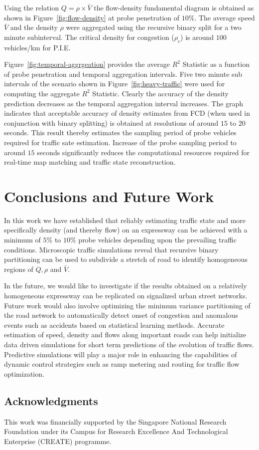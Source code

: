 \documentclass[procedia]{easychair}
\begin{document}
Using the relation $Q=\rho\times \bar{V}$ the flow-density fundamental diagram is obtained as shown in Figure~\ref{fig:flow-density} at probe penetration of $10\%$. The average speed $\bar{V}$ and the density $\rho$ were aggregated using the recursive binary split for a two minute subinterval. The critical density for congestion ($\rho_{c}$) is around $100$ vehicles/km for P.I.E.

Figure~\ref{fig:temporal-aggrgeation} provides the average $R^2$ Statistic as a function of probe penetration and temporal aggregation intervals. Five two minute sub intervals of the  scenario shown in Figure~\ref{fig:heavy-traffic} were used for computing the aggregate $R^2$ Statistic. Clearly the accuracy of the density prediction decreases as the temporal aggregation interval increases. The graph indicates that acceptable accuracy of density estimates from FCD (when used in conjunction with binary splitting) is obtained at resolutions of around $15$ to $20$ seconds. This result thereby estimates the sampling period of probe vehicles required for traffic sate estimation. Increase of the probe sampling period to around $15$ seconds significantly reduces the computational resources required for real-time map matching and traffic state reconstruction. 



\section{Conclusions and Future Work}
\label{sect:future-work}

In this work we have established that reliably estimating traffic state and  more specifically density (and thereby flow) on an expressway can be achieved with a minimum of $5\%$ to $10\%$ probe vehicles depending upon the prevailing traffic conditions. Microscopic traffic simulations reveal that recursive binary partitioning can be used to subdivide a stretch of road to identify homogeneous regions of $Q, \rho$ and $\bar{V}$.

In the future, we would like to investigate if the results obtained on a relatively homogeneous expressway can be replicated on signalized urban street networks. Future work would also involve optimizing the minimum variance partitioning of the road network to automatically detect onset of congestion and anomalous events such as accidents based on statistical learning methods. Accurate estimation of speed, density and flows along important roads can help initialize data driven simulations for short term predictions of the evolution of traffic flows. Predictive simulations will play a major role in enhancing the capabilities of dynamic control strategies such as ramp metering and routing for traffic flow optimization.


\subsection{Acknowledgments}
\label{sect:acks}
This work was financially supported by the Singapore National Research Foundation under its Campus for Research Excellence And Technological Enterprise (CREATE) programme.

\label{sect:bib}


\end{document}
